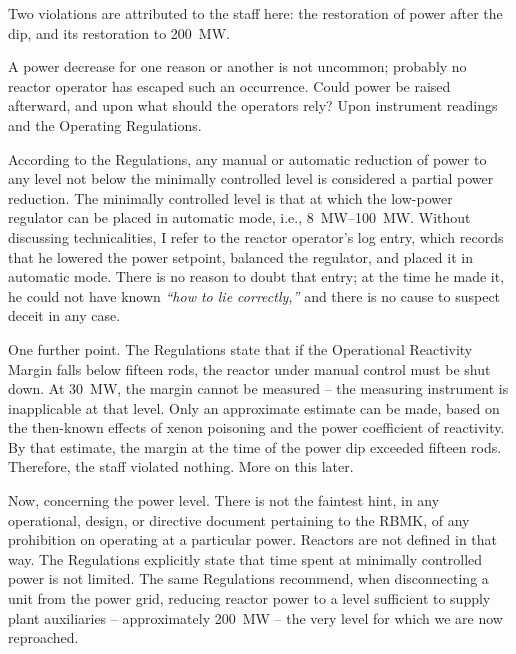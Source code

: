 \documentclass[openright]{bookest}
\begin{document}
Two violations are attributed to the staff here: the restoration of power after the dip, and its restoration to \qty{200}{\mega\watt}.

A power decrease for one reason or another is not uncommon; probably no reactor operator has escaped such an occurrence. Could power be raised afterward, and upon what should the operators rely? Upon instrument readings and the Operating Regulations.


According to the Regulations, any manual or automatic reduction of power to any level not below the minimally controlled level is considered a partial power reduction. The minimally controlled level is that at which the low-power regulator can be placed in automatic mode, i.e., \qtyrange{8}{100}{\mega\watt}. Without discussing technicalities, I refer to the reactor operator's log entry, which records that he lowered the power setpoint, balanced the regulator, and placed it in automatic mode. There is no reason to doubt that entry; at the time he made it, he could not have known \textit{``how to lie correctly,''} and there is no cause to suspect deceit in any case.

One further point. The Regulations state that if the Operational Reactivity Margin falls below fifteen rods, the reactor under manual control must be shut down. At \qty{30}{\mega\watt}, the margin cannot be measured -- the measuring instrument is inapplicable at that level. Only an approximate estimate can be made, based on the then-known effects of xenon poisoning and the power coefficient of reactivity. By that estimate, the margin at the time of the power dip exceeded fifteen rods. Therefore, the staff violated nothing. More on this later.

Now, concerning the power level. There is not the faintest hint, in any operational, design, or directive document pertaining to the RBMK, of any prohibition on operating at a particular power. Reactors are not defined in that way. The Regulations explicitly state that time spent at minimally controlled power is not limited. The same Regulations recommend, when disconnecting a unit from the power grid, reducing reactor power to a level sufficient to supply plant auxiliaries -- approximately \qty{200}{\mega\watt} -- the very level for which we are now reproached.
\end{document}
